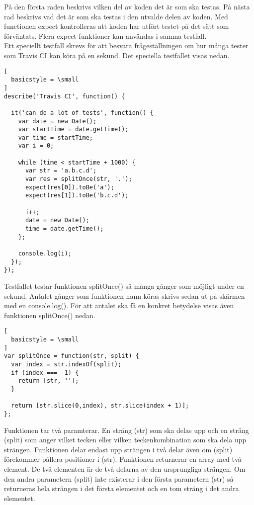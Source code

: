 På den första raden beskrivs vilken del av koden det är som ska testas.
På nästa rad beskrivs vad det är som ska testas i den utvalde delen av koden.
Med functionen expect kontrolleras att koden har utfört testet på det sätt
som förväntats. Flera expect-funktioner kan användas i samma testfall.\\

Ett speciellt testfall skrevs
för att besvara frågeställningen om hur många tester som Travis CI kan köra
på en sekund. Det speciella testfallet visas nedan.

\begin{lstlisting}[
  basicstyle = \small
]
describe('Travis CI', function() {
	
  it('can do a lot of tests', function() {
    var date = new Date();
    var startTime = date.getTime();
    var time = startTime;
    var i = 0;

    while (time < startTime + 1000) {  
      var str = 'a.b.c.d';
      var res = splitOnce(str, '.');
      expect(res[0]).toBe('a');
      expect(res[1]).toBe('b.c.d');

      i++;
      date = new Date(); 
      time = date.getTime();
    };

    console.log(i);
  });
});
\end{lstlisting}

Testfallet testar funktionen splitOnce() så många gånger som möjligt
under en sekund. Antalet gånger som funktionen hann köras skrivs
sedan ut på skärmen med en console.log(). För att antalet ska
få en konkret betydelse visas även funktionen splitOnce() nedan.

\begin{lstlisting}[
  basicstyle = \small
]
var splitOnce = function(str, split) {
  var index = str.indexOf(split);
  if (index === -1) {
    return [str, ''];
  }

  return [str.slice(0,index), str.slice(index + 1)];
};
\end{lstlisting}

Funktionen tar två paramterar. En sträng (str) som ska delas upp och 
en sträng (split) som anger vilket tecken eller vilken teckenkombination
som ska dela upp strängen. Funktionen delar endast upp strängen i två delar
även om (split) förekommer påflera positioner i (str). Funktionen returnerar 
en array med två element.
De två elementen är de två delarna av den ursprungliga strängen. Om den andra
parametern (split) inte existerar i den första parametern (str) så returneras
hela strängen i det första elementet och en tom sträng i det andra elementet.\\


